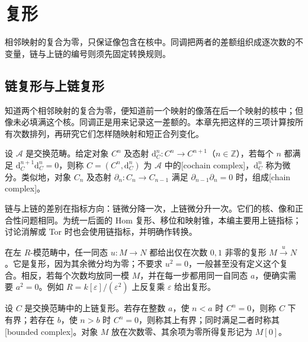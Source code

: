 
\section{复形}
\label{b4:sec:0501}

相邻映射的复合为零，只保证像包含在核中。同调把两者的差额组织成逐次数的不变量，链与上链的编号则须先固定转换规则。

%
%

\subsection{链复形与上链复形}
\label{b4:subsec:0501:01}

知道两个相邻映射的复合为零，便知道前一个映射的像落在后一个映射的核中；但像未必填满这个核。同调正是用来记录这一差额的。本章先把这样的三项计算按所有次数排列，再研究它们怎样随映射和短正合列变化。

\begin{definition}\label{b4:def:cochain-complex}
设 \(\mathcal A\) 是交换范畴。给定对象 \(C^n\) 及态射 \(\mathrm{d}_C^n:C^n\to C^{n+1}\)（\(n\in\mathbb Z\)），若每个 \(n\) 都满足 \(\mathrm{d}_C^{n+1}\mathrm{d}_C^n=0\)，则称 \(C=(C^n,\mathrm{d}_C^n)\) 为 \(\mathcal A\) 中的[cochain complex]，\(\mathrm{d}_C^n\) 称为微分。类似地，对象 \(C_n\) 及态射 \(\partial_n:C_n\to C_{n-1}\) 满足 \(\partial_{n-1}\partial_n=0\) 时，组成[chain complex]。
\end{definition}

链与上链的差别在指标方向：链微分降一次，上链微分升一次。它们的核、像和正合性问题相同。为统一后面的 Hom 复形、移位和映射锥，本编主要用上链指标；讨论消解或 Tor 时也会使用链指标，并明确作转换。

\begin{example}\label{b4:exm:two-term-complex}
在左 \(R\)-模范畴中，任一同态 \(u:M\to N\) 都给出仅在次数 \(0,1\) 非零的复形 \(M\xrightarrow{u}N\)。它是复形，因为其余微分均为零；不要求 \(u^2=0\)，一般甚至没有定义这个复合。相反，若每个次数均放同一模 \(M\)，并在每一步都用同一自同态 \(a\)，便确实需要 \(a^2=0\)。例如 \(R=k[\varepsilon]/(\varepsilon^2)\) 上反复乘 \(\varepsilon\) 给出复形。
\end{example}

\begin{definition}\label{b4:def:bounded-complex}
设 \(C\) 是交换范畴中的上链复形。若存在整数 \(a\)，使 \(n<a\) 时 \(C^n=0\)，则称 \(C\) 下有界；若存在 \(b\)，使 \(n>b\) 时 \(C^n=0\)，则称其上有界；同时满足二者时称其[bounded complex]。对象 \(M\) 放在次数零、其余项为零所得复形记为 \(M[0]\)。
\end{definition}

